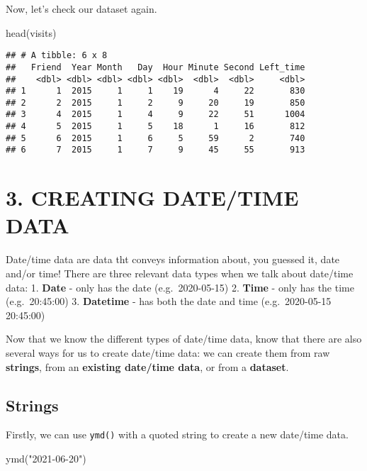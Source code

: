 \documentclass[
]{book}
\newenvironment{Shaded}{\begin{snugshade}}{\end{snugshade}}
\newcommand{\FunctionTok}[1]{\textcolor[rgb]{0.00,0.00,0.00}{#1}}
\newcommand{\NormalTok}[1]{#1}
\newcommand{\StringTok}[1]{\textcolor[rgb]{0.31,0.60,0.02}{#1}}
\begin{document}
Now, let's check our dataset again.

\begin{Shaded}
\begin{Highlighting}[]
\FunctionTok{head}\NormalTok{(visits)}
\end{Highlighting}
\end{Shaded}

\begin{verbatim}
## # A tibble: 6 x 8
##   Friend  Year Month   Day  Hour Minute Second Left_time
##    <dbl> <dbl> <dbl> <dbl> <dbl>  <dbl>  <dbl>     <dbl>
## 1      1  2015     1     1    19      4     22       830
## 2      2  2015     1     2     9     20     19       850
## 3      4  2015     1     4     9     22     51      1004
## 4      5  2015     1     5    18      1     16       812
## 5      6  2015     1     6     5     59      2       740
## 6      7  2015     1     7     9     45     55       913
\end{verbatim}

\hypertarget{creating-datetime-data}{%
\section{3. CREATING DATE/TIME DATA}\label{creating-datetime-data}}

Date/time data are data tht conveys information about, you guessed it, date and/or time! There are three relevant data types when we talk about date/time data:
1. \textbf{Date} - only has the date (e.g.~2020-05-15)
2. \textbf{Time} - only has the time (e.g.~20:45:00)
3. \textbf{Datetime} - has both the date and time (e.g.~2020-05-15 20:45:00)

Now that we know the different types of date/time data, know that there are also several ways for us to create date/time data: we can create them from raw \textbf{strings}, from an \textbf{existing date/time data}, or from a \textbf{dataset}.

\hypertarget{strings-1}{%
\subsection{Strings}\label{strings-1}}

Firstly, we can use \texttt{ymd()} with a quoted string to create a new date/time data.

\begin{Shaded}
\begin{Highlighting}[]
\FunctionTok{ymd}\NormalTok{(}\StringTok{"2021{-}06{-}20"}\NormalTok{)}
\end{Highlighting}
\end{Shaded}
\end{document}
